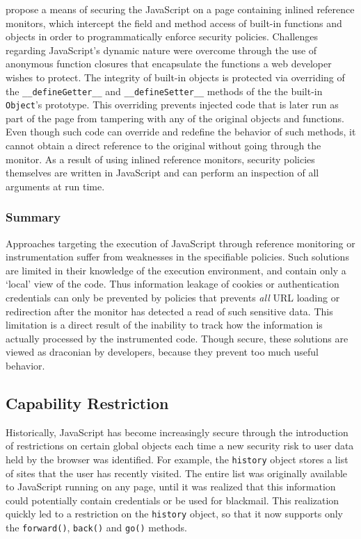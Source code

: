 \documentclass{acmtrans2m}
\begin{document}
 propose a means of securing the JavaScript on a page containing inlined reference monitors, which intercept the field and method access of built-in functions and objects in order to programmatically enforce security policies.
Challenges regarding JavaScript's dynamic nature were overcome through the use of anonymous function closures that encapsulate the functions a web developer wishes to protect.
The integrity of built-in objects is protected via overriding of the \texttt{\_\_defineGetter\_\_} and \texttt{\_\_defineSetter\_\_} methods of the the built-in \texttt{Object}'s prototype.
This overriding prevents injected code that is later run as part of the page from tampering with any of the original objects and functions.
Even though such code can override and redefine the behavior of such methods, it cannot obtain a direct reference to the original without going through the monitor.
As a result of using inlined reference monitors, security policies themselves are written in JavaScript and can perform an inspection of all arguments at run time.


\subsubsection*{Summary}
Approaches targeting the execution of JavaScript through reference monitoring or instrumentation suffer from weaknesses in the specifiable policies.
Such solutions are limited in their knowledge of the execution environment, and contain only a `local' view of the code.
Thus information leakage of cookies or authentication credentials can only be prevented by policies that prevents \emph{all} URL loading or redirection after the monitor has detected a read of such sensitive data.
This limitation is a direct result of the inability to track how the information is actually processed by the instrumented code.
Though secure, these solutions are viewed as draconian by developers, because they prevent too much useful behavior.

\subsection{Capability Restriction}
Historically, JavaScript has become increasingly secure through the introduction of restrictions on certain global objects each time a new security risk to user data held by the browser was identified.
For example, the \texttt{history} object stores a list of sites that the user has recently visited.
The entire list was originally available to JavaScript running on any page, until it was realized that this information could potentially contain credentials or be used for blackmail.
This realization quickly led to a restriction on the \texttt{history} object, so that it now supports only the \texttt{forward()}, \texttt{back()} and \texttt{go()} methods.
\end{document}
